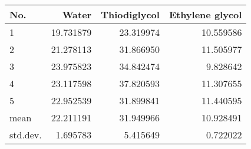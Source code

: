 \begin{tabular}{lrrr}
\toprule
     No. & Water & Thiodiglycol & Ethylene glycol \\
\midrule
       1 & 19.731879 & 23.319974 & 10.559586 \\
       2 & 21.278113 & 31.866950 & 11.505977 \\
       3 & 23.975823 & 34.842474 & 9.828642 \\
       4 & 23.117598 & 37.820593 & 11.307655 \\
       5 & 22.952539 & 31.899841 & 11.440595 \\
    mean & 22.211191 & 31.949966 & 10.928491 \\
std.dev. & 1.695783 & 5.415649 & 0.722022 \\
\bottomrule
\end{tabular}